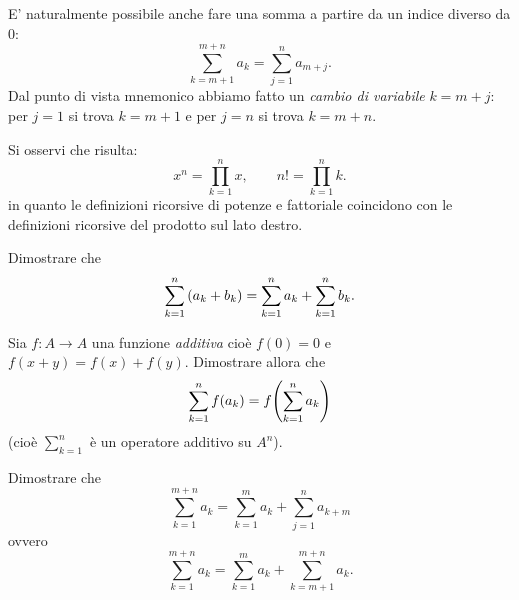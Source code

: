 E' naturalmente possibile anche fare una somma a partire da un indice 
diverso da $0$:
\[
  \sum_{k=m+1}^{m+n} a_k = \sum_{j=1}^{n} a_{m+j}.
\]
Dal punto di vista mnemonico abbiamo fatto 
un \emph{cambio di variabile} $k=m+j$:
per $j=1$ si trova $k=m+1$ e per $j=n$ si trova $k=m+n$.

Si osservi che risulta:
\[
  x^n = \prod_{k=1}^n x, \qquad 
  n! = \prod_{k=1}^n k.  
\]
in quanto le definizioni ricorsive di potenze e fattoriale
coincidono con le definizioni ricorsive del prodotto sul lato destro.


\begin{exercise}
Dimostrare che 
  \[
  \sum_{k=1}^n  {\left( a_k + b_k \right)} 
  = \sum_{k=1}^n a_k + \sum_{k=1}^n b_k.
  \]
\end{exercise}

\begin{exercise}
  Sia $f\colon A\to A$ una funzione \emph{additiva}
  cioè $f(0) = 0$ e $f(x+y)=f(x)+f(y)$.
  Dimostrare allora che 
  \[
    \sum_{k=1}^n  f(a_k) = f{\left( \sum_{k=1}^n a_k \right)}
  \]
  (cioè $\sum_{k=1}^n$ è un operatore additivo su $A^n$).
\end{exercise}

\begin{exercise}
  Dimostrare che 
  \[
  \sum_{k=1}^{m+n} a_k = \sum_{k=1}^m a_k + \sum_{j=1}^n a_{k+m}
  \]
  ovvero 
  \[
  \sum_{k=1}^{m+n} a_k = \sum_{k=1}^m a_k + \sum_{k=m+1}^{m+n} a_k.  
  \]

\end{exercise}

